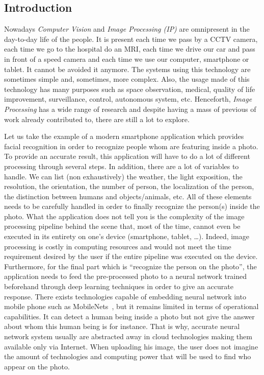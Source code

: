 \subsection*{Introduction}


Nowadays \emph{Computer Vision} and \emph{Image Processing (IP)} are omnipresent in the day-to-day
life of the people. It is present each time we pass by a CCTV camera, each time we go to the hospital do an MRI, each
time we drive our car and pass in front of a speed camera and each time we use our computer, smartphone or tablet. It
cannot be avoided it anymore. The systems using this technology are sometimes simple and, sometimes, more complex. Also,
the usage made of this technology has many purposes such as space observation, medical, quality of life improvement,
surveillance, control, autonomous system, etc. Henceforth, \emph{Image Processing} has a wide range of research and
despite having a mass of previous of work already contributed to, there are still a lot to explore.

Let us take the example of a modern smartphone application which provides facial recognition in order to recognize
people whom are featuring inside a photo. To provide an accurate result, this application will have to do a lot of
different processing through several steps. In addition, there are a lot of variables to handle. We can list (non
exhaustively) the weather, the light exposition, the resolution, the orientation, the number of person, the localization
of the person, the distinction between humans and objects/animals, etc. All of these elements needs to be carefully
handled in order to finally recognize the person(s) inside the photo. What the application does not tell you is the
complexity of the image processing pipeline behind the scene that, most of the time, cannot even be executed in its
entirety on one's device (smartphone, tablet, \ldots). Indeed, image processing is costly in computing resources and
would not meet the time requirement desired by the user if the entire pipeline was executed on the device. Furthermore,
for the final part which is ``recognize the person on the photo'', the application needs to feed the pre-processed photo
to a neural network trained beforehand through deep learning techniques in order to give an accurate response. There
exists technologies capable of embedding neural network into mobile phone such as
MobileNets~\parencite{howard.2017.mobilenets}, but it remains limited in terms of operational capabilities. It can
detect a human being inside a photo but not give the answer about whom this human being is for instance. That is why,
accurate neural network system usually are abstracted away in cloud technologies making them available only via
Internet. When uploading his image, the user does not imagine the amount of technologies and computing power that will
be used to find who appear on the photo.

